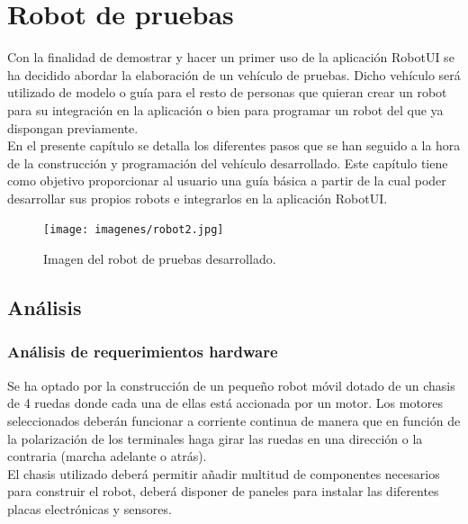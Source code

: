 
\newpage


\chapter{Robot de pruebas}
\label{chap:robot}

Con la finalidad de demostrar y hacer un primer uso de la aplicación RobotUI se ha decidido abordar la elaboración de un vehículo de pruebas. Dicho vehículo será utilizado de modelo o guía para el 
resto de personas que quieran crear un robot para su integración en la aplicación o bien para programar un robot del que ya dispongan previamente.\\

En el presente capítulo se detalla los diferentes pasos que se han seguido a la hora de la construcción y programación del vehículo desarrollado. Este capítulo tiene como objetivo proporcionar al usuario
una guía básica a partir de la cual poder desarrollar sus propios robots e integrarlos en la aplicación RobotUI.\\


\begin{figure}[H]
  \begin{center}
    \texttt{[image: imagenes/robot2.jpg]}
  \end{center}
  \caption{Imagen del robot de pruebas desarrollado.}
  \label{robot:robot02}
\end{figure}


\section{Análisis}
\label{sec:analisis}

\subsection{Análisis de requerimientos hardware}
\label{sec:requerimientos-hardware}

Se ha optado por la construcción de un  pequeño robot móvil dotado de un chasis de 4 ruedas donde cada una de ellas está accionada por un motor. Los motores seleccionados deberán funcionar a 
corriente continua de manera que en función de la polarización de los terminales haga girar las ruedas en una dirección o la contraria (marcha adelante o atrás).\\

El chasis utilizado deberá permitir añadir multitud de componentes necesarios para construir el robot, deberá disponer de paneles para instalar las diferentes
placas electrónicas y sensores.\\

